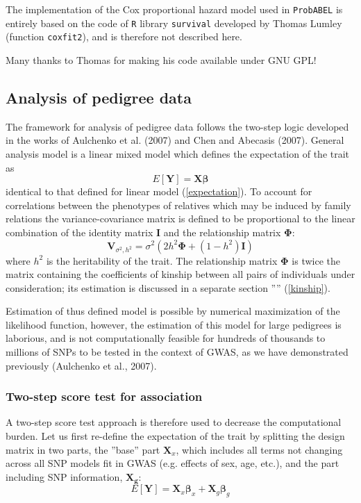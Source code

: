 \documentclass[12pt,a4paper]{article}
\begin{document}
The implementation of the Cox proportional hazard model used 
in \texttt{ProbABEL} is entirely based on the code of \texttt{R} 
library \texttt{survival} developed by Thomas Lumley 
(function \texttt{coxfit2}), and is therefore not described here. 

Many thanks to Thomas for making his code available under GNU GPL!

\subsection{Analysis of pedigree data}

The framework for analysis of pedigree data follows the two-step 
logic developed in the works of Aulchenko et al. (2007) and Chen and Abecasis
(2007). General analysis model is a linear mixed model which defines the
expectation of the trait as 
$$
E[\mathbf{Y}] = \mathbf{X} \mathbf{\beta}
$$
identical to that defined for linear model (\ref{expectation}).
To account for correlations between the phenotypes of
relatives which may be induced by family relations the variance-covariance 
matrix is defined to be proportional to the linear combination of the
identity matrix $\mathbf{I}$ and the relationship matrix $\mathbf{\Phi}$: 
$$
\mathbf{V}_{\sigma^2,h^2} = \sigma^2 (2 h^2 \mathbf{\Phi} + (1-h^2) \mathbf{I})
$$
where $h^2$ is the heritability of the trait. 
The relationship matrix $\mathbf{\Phi}$ is twice the matrix containing 
the coefficients of kinship between all pairs of individuals under consideration; 
its estimation is discussed in a separate section '''' (\ref{kinship}).

Estimation of thus defined model is possible by numerical maximization of the
likelihood function, however, the estimation of this model 
for large pedigrees is laborious, and is not computationally feasible for
hundreds of thousands to millions of SNPs to be tested in the context of GWAS,
as we have demonstrated previously (Aulchenko et al., 2007).

\subsubsection{Two-step score test for association}

A two-step score test approach is therefore used to decrease the computational
burden. Let us first re-define the expectation of the trait by splitting the 
design matrix in two parts, the ''base'' part $\mathbf{X}_x$, which includes all 
terms not changing across all SNP models fit in GWAS (e.g. effects of sex, age, etc.), 
and the part including SNP information, $\mathbf{X_g}$:
$$
E[\mathbf{Y}] = \mathbf{X}_x \mathbf{\beta}_x + \mathbf{X}_g \mathbf{\beta}_g
$$
\end{document}
